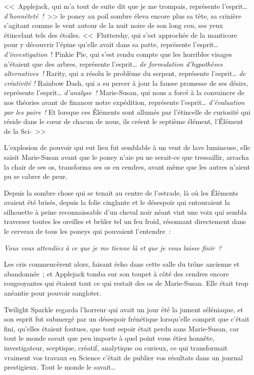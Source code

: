 <<~Applejack, qui m'a tout de suite dit que je me trompais, représente l'esprit… \emph{d'honnêteté~!}~>> le poney au poil sombre éleva encore plus sa tête, sa crinière s'agitant comme le vent autour de la nuit noire de son long cou, ses yeux étincelant tels des étoiles. <<~Fluttershy, qui s'est approchée de la manticore pour y découvrir l'épine qu'elle avait dans sa patte, représente l'esprit… \emph{d'investigation}~! Pinkie Pie, qui s'est rendu compte que les horribles visages n'étaient que des arbres, représente l'esprit… \emph{de formulation d'hypothèses alternatives~!} Rarity, qui a résolu le problème du serpent, représente l'esprit… \emph{de créativité} \emph{!} Rainbow Dash, qui a su percer à jour la fausse promesse de ses désirs, représente l'esprit… \emph{d'analyse~!} Marie-Susan, qui nous a forcé à la convaincre de nos théories avant de financer notre expédition, représente l'esprit… \emph{d'évaluation par les pairs~!} Et lorsque ces Éléments sont allumés par l'étincelle de curiosité qui réside dans le cœur de chacun de nous, ils créent le septième élément, l'Élément de la Sci-~>>

L'explosion de pouvoir qui eut lieu fut semblable à un vent de lave lumineuse, elle saisit Marie-Susan avant que le poney n'aie pu ne serait-ce que tressaillir, arracha la chair de ses os, transforma ses os en cendres, avant même que les autres n'aient pu se cabrer de peur.

Depuis la sombre chose qui se tenait au centre de l'estrade, là où les Éléments avaient été brisés, depuis la folie cinglante et le désespoir qui entouraient la silhouette à peine reconnaissable d'un cheval noir néant vint une voix qui sembla traverser toutes les oreilles et brûler tel un feu froid, résonnant directement dans le cerveau de tous les poneys qui pouvaient l'entendre~:

\emph{Vous vous attendiez à ce que je me tienne là et que je vous laisse finir~?}

Les cris commencèrent alors, faisant écho dans cette salle du trône ancienne et abandonnée~; et Applejack tomba sur son toupet à côté des cendres encore rougeoyantes qui étaient tout ce qui restait des os de Marie-Susan. Elle était trop anéantie pour pouvoir sangloter.

Twilight Sparkle regarda l'horreur qui avait un jour été la jument séléniaque, et son esprit fut submergé par un désespoir frénétique lorsqu'elle comprit que c'était fini, qu'elles étaient foutues, que tout espoir était perdu sans Marie-Susan, car tout le monde savait que peu importe à quel point vous étiez honnête, investigateur, sceptique, créatif, analytique ou curieux, ce qui transformait vraiment vos travaux en Science c'était de publier vos résultats dans un journal prestigieux. Tout le monde le savait…


